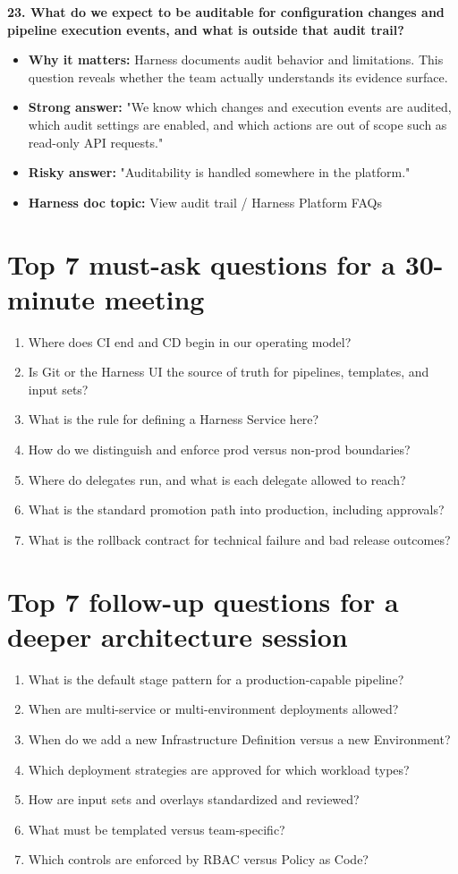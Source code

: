 \documentclass[11pt]{article}
\newcommand{\qblock}[5]{%
  \textbf{#1}\par
  \begin{itemize}[leftmargin=1.5em,itemsep=0.2em,topsep=0.3em]
    \item[--] \textbf{Why it matters:} #2
    \item[--] \textbf{Strong answer:} #3
    \item[--] \textbf{Risky answer:} #4
    \item[--] \textbf{Harness doc topic:} #5
  \end{itemize}
  \vspace{0.4em}
}
\begin{document}
\qblock{23. What do we expect to be auditable for configuration changes and pipeline execution events, and what is outside that audit trail?}{Harness documents audit behavior and limitations. This question reveals whether the team actually understands its evidence surface.}{"We know which changes and execution events are audited, which audit settings are enabled, and which actions are out of scope such as read-only API requests."}{"Auditability is handled somewhere in the platform."}{View audit trail / Harness Platform FAQs}

\section*{Top 7 must-ask questions for a 30-minute meeting}
\begin{enumerate}[leftmargin=1.5em,itemsep=0.25em]
  \item Where does CI end and CD begin in our operating model?
  \item Is Git or the Harness UI the source of truth for pipelines, templates, and input sets?
  \item What is the rule for defining a Harness Service here?
  \item How do we distinguish and enforce prod versus non-prod boundaries?
  \item Where do delegates run, and what is each delegate allowed to reach?
  \item What is the standard promotion path into production, including approvals?
  \item What is the rollback contract for technical failure and bad release outcomes?
\end{enumerate}

\section*{Top 7 follow-up questions for a deeper architecture session}
\begin{enumerate}[leftmargin=1.5em,itemsep=0.25em]
  \item What is the default stage pattern for a production-capable pipeline?
  \item When are multi-service or multi-environment deployments allowed?
  \item When do we add a new Infrastructure Definition versus a new Environment?
  \item Which deployment strategies are approved for which workload types?
  \item How are input sets and overlays standardized and reviewed?
  \item What must be templated versus team-specific?
  \item Which controls are enforced by RBAC versus Policy as Code?
\end{enumerate}
\end{document}
